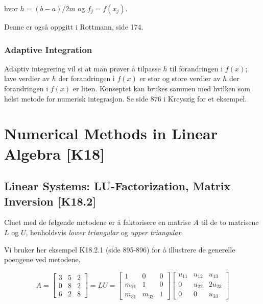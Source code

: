 \documentclass[norsk, a4paper, 12pt, titlepage]{article}
\begin{document}
hvor $h = (b-a)/2m$ og $f_{j} = f(x_{j})$.

Denne er også oppgitt i Rottmann, side 174.


\subsubsection{Adaptive Integration}

Adaptiv integrering vil si at man prøver å tilpasse $h$ til
forandringen i $f(x)$; lave verdier av $h$ der forandringen i $f(x)$
er stor og store verdier av $h$ der forandringen i $f(x)$ er liten.
Konseptet kan brukes sammen med hvilken som helst metode for numerisk
integrasjon.  Se side 876 i Kreyszig for et eksempel.

\newpage
\section{Numerical Methods in Linear Algebra [K18]}

\subsection{Linear Systems: LU-Factorization, Matrix Inversion [K18.2]}
Cluet med de følgende metodene er å faktorisere en matrise $A$ til de
to matrisene $L$ og $U$, henholdsvis \textit{lower triangular} og
\textit{upper triangular}. 

Vi bruker her eksempel K18.2.1 (side 895-896) for å illustrere de
generelle poengene ved metodene.

\begin{equation*}
A = \left[ \begin{array}{ccc}
3 & 5 & 2 \\
0 & 8 & 2 \\
6 & 2 & 8 \end{array} \right]
= LU =
\left[ \begin{array}{ccc}
1 & 0 & 0 \\
m_{21} & 1 & 0 \\
m_{31} & m_{32} & 1 \end{array} \right]
\left[ \begin{array}{ccc}
u_{11} & u_{12} & u_{13} \\
0 & u_{22} & 2u_{23} \\
0 & 0 & u_{33} \end{array} \right]
\end{equation*}
\end{document}
